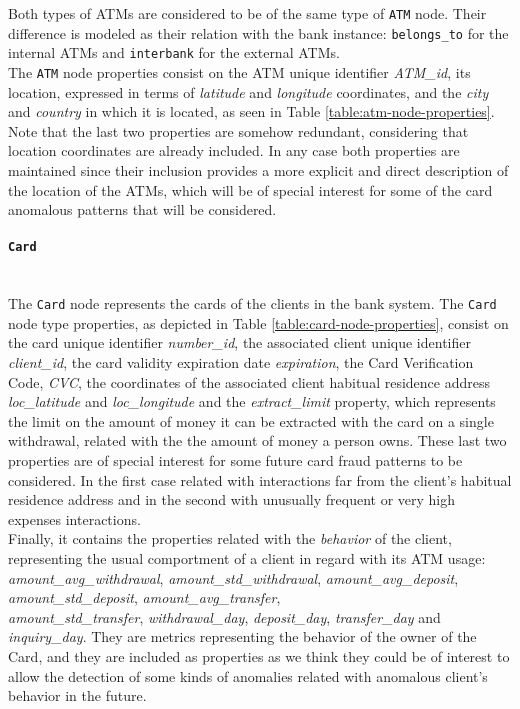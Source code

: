 Both types of ATMs are considered to be of the same type of \texttt{ATM} node. Their difference is modeled as their relation with the bank instance: \texttt{belongs\_to} for the internal ATMs and \texttt{interbank} for the external ATMs.\\



The \texttt{ATM} node properties consist on the ATM unique identifier \emph{ATM\_id}, its location, expressed in terms of \emph{latitude} and \emph{longitude} coordinates, and the \emph{city} and 
\emph{country} in which it is located, as seen in Table \ref{table:atm-node-properties}.
Note that the last two properties are somehow redundant, considering that location coordinates
are already included. In any case both properties are maintained since their inclusion provides a more explicit and direct description of the location of the ATMs, which will be of special interest for some of the card anomalous patterns that will be considered.\\

\paragraph{\texttt{Card}\\\\}

The \texttt{Card} node represents the cards of the clients in the bank system. The \texttt{Card} node type properties, as depicted in Table
\ref{table:card-node-properties}, consist on the card unique 
identifier \emph{number\_id}, the associated client unique identifier \emph{client\_id}, the card validity expiration date \emph{expiration}, the Card Verification Code, \emph{CVC}, the coordinates of the associated client habitual residence address \emph{loc\_latitude} and 
\emph{loc\_longitude} and the \emph{extract\_limit} property, which represents the limit on the amount of money it can be extracted with the card on a single withdrawal, related with the the amount of money a person owns. These last two properties are of special interest for some future card fraud patterns to be considered. In the first case related with interactions far from the client's habitual residence address and in the second with unusually frequent or very high expenses interactions.\\

Finally, it contains the properties related with the \emph{behavior} of the client, representing the usual comportment of a client in regard with its ATM usage: \emph{amount\_avg\_withdrawal}, \emph{amount\_std\_withdrawal}, \emph{amount\_avg\_deposit}, 
\emph{amount\_std\_deposit}, \emph{amount\_avg\_transfer},\\  \emph{amount\_std\_transfer}, \emph{withdrawal\_day}, \emph{deposit\_day}, \emph{transfer\_day} and \emph{inquiry\_day}.
They are metrics representing the behavior of the owner of the Card, and they are included as properties as we think they could be of interest to allow the detection of some kinds of anomalies related with anomalous client's behavior in the future.

